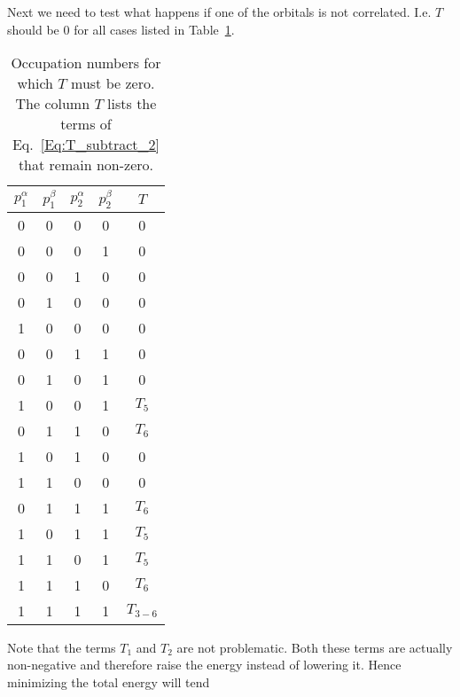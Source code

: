 \documentclass[pra]{revtex4-1}
\begin{document}
Next we need to test what happens if one of the orbitals is not correlated. I.e. $T$ should be $0$ for all
cases listed in Table~\ref{Table:T_subtract_occ}.
\begin{table}
\begin{tabular}{cccc|c}
\hline
$p_1^\alpha$ & $p_1^\beta$ & $p_2^\alpha$ & $p_2^\beta$ & $T$ \\
\hline
0            & 0           & 0            & 0           &  0  \\
0            & 0           & 0            & 1           &  0  \\
0            & 0           & 1            & 0           &  0  \\
0            & 1           & 0            & 0           &  0  \\
1            & 0           & 0            & 0           &  0  \\
0            & 0           & 1            & 1           &  0  \\
0            & 1           & 0            & 1           &  0  \\
1            & 0           & 0            & 1           &  $T_5$   \\
0            & 1           & 1            & 0           &  $T_6$   \\
1            & 0           & 1            & 0           &  0  \\
1            & 1           & 0            & 0           &  0  \\
0            & 1           & 1            & 1           &  $T_6$   \\
1            & 0           & 1            & 1           &  $T_5$   \\
1            & 1           & 0            & 1           &  $T_5$   \\
1            & 1           & 1            & 0           &  $T_6$   \\
1            & 1           & 1            & 1           &  $T_{3-6}$  \\
\hline
\end{tabular}
\caption{Occupation numbers for which $T$ must be zero. The column $T$ lists
         the terms of Eq.~\ref{Eq:T_subtract_2} that remain non-zero.}
\label{Table:T_subtract_occ}
\end{table}
Note that the terms $T_1$ and $T_2$ are not problematic. Both these terms are actually non-negative 
and therefore raise the energy instead of lowering it. Hence minimizing the total energy will tend
\end{document}
